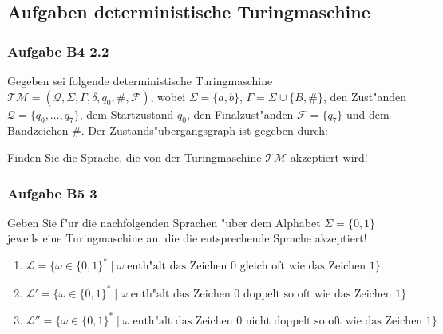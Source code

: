 \subsection{Aufgaben deterministische Turingmaschine}
\begin{frame}
\frametitle{Aufgabe B4 2.2}
Gegeben sei folgende deterministische Turingmaschine $\mathcal{TM} =
(\mathcal{Q},\Sigma,\Gamma,\delta,q_0,\#,\mathcal{F})$, wobei $\Sigma = \{a,b\}$,
$\Gamma = \Sigma \cup \{B,\#\}$, den Zust"anden $\mathcal{Q} = \{q_0,\dots,q_7\}$,
dem Startzustand $q_0$, den Finalzust"anden $\mathcal{F} = \{q_7\}$ und dem
Bandzeichen $\#$. Der Zustands"ubergangsgraph ist gegeben durch:
\begin{center}
\resizebox{10cm}{!} {
}
\end{center}
Finden Sie die Sprache, die von der Turingmaschine $\mathcal{TM}$ akzeptiert wird!
\end{frame}
\begin{frame}
	\frametitle{Aufgabe B5 3}
	Geben Sie f"ur die nachfolgenden Sprachen "uber dem Alphabet $\Sigma = \{0,1\}$
	jeweils eine Turingmaschine an, die die entsprechende Sprache akzeptiert!
	\begin{enumerate}
		\item $\mathcal{L} = \{ \omega \in \{0,1\}^* \; | \; \omega \;
		\mbox{enth"alt das Zeichen $0$ gleich oft wie das Zeichen $1$} \}$
		\item $\mathcal{L}' = \{ \omega \in \{0,1\}^* \; | \; \omega \;
		\mbox{enth"alt das Zeichen $0$ doppelt so oft wie das Zeichen $1$} \}$
		\item $\mathcal{L}'' = \{ \omega \in \{0,1\}^* \; | \; \omega \;
		\mbox{enth"alt das Zeichen $0$ nicht doppelt so oft wie das Zeichen $1$} \}$
	\end{enumerate}
\end{frame}


